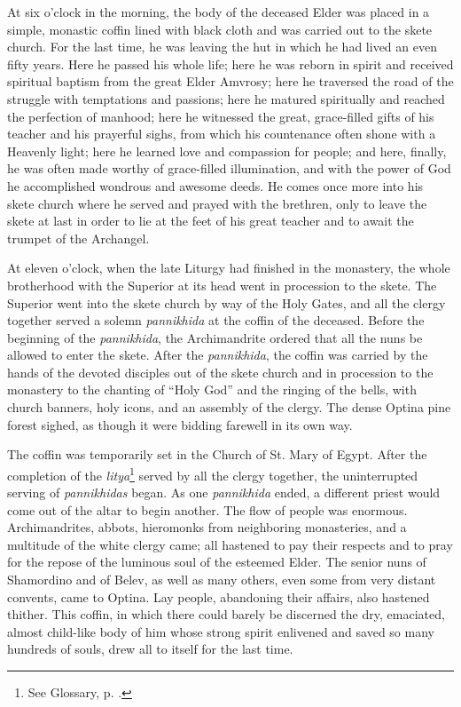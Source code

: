 At six o'clock in the morning, the body of the deceased Elder was placed in a simple, monastic coffin lined with black cloth and was carried out to the skete church. For the last time, he was leaving the hut in which he had lived an even fifty years. Here he passed his whole life; here he was reborn in spirit and received spiritual baptism from the great Elder Amvrosy; here he traversed the road of the struggle with temptations and passions; here he matured spiritually and reached the perfection of manhood; here he witnessed the great, grace-filled gifts of his teacher and his prayerful sighs, from which his countenance often shone with a Heavenly light; here he learned love and compassion for people; and here, finally, he was often made worthy of grace-filled illumination, and with the power of God he accomplished wondrous and awesome deeds. He comes once more into his skete church where he served and prayed with the brethren, only to leave the skete at last in order to lie at the feet of his great teacher and to await the trumpet of the Archangel.

At eleven o'clock, when the late Liturgy had finished in the monastery, the whole brotherhood with the Superior at its head went in procession to the skete. The Superior went into the skete church by way of the Holy Gates, and all the clergy together served a solemn \textit{pannikhida} at the coffin of the deceased. Before the beginning of the \textit{pannikhida}, the Archimandrite ordered that all the nuns be allowed to enter the skete. After the \textit{pannikhida}, the coffin was carried by the hands of the devoted disciples out of the skete church and in procession to the monastery to the chanting of “Holy God” and the ringing of the bells, with church banners, holy icons, and an assembly of the clergy. The dense Optina pine forest sighed, as though it were bidding farewell in its own way.

The coffin was temporarily set in the Church of St. Mary of Egypt. After the completion of the \textit{litya}\footnote{See Glossary, p. \pageref{litya}.} served by all the clergy together, the uninterrupted serving of \textit{pannikhidas} began. As one \textit{pannikhida} ended, a different priest would come out of the altar to begin another. The flow of people was enormous. Archimandrites, abbots, hieromonks from neighboring monasteries, and a multitude of the white clergy came; all hastened to pay their respects and to pray for the repose of the luminous soul of the esteemed Elder. The senior nuns of Shamordino and of Belev, as well as many others, even some from very distant convents, came to Optina. Lay people, abandoning their affairs, also hastened thither. This coffin, in which there could barely be discerned the dry, emaciated, almost child-like body of him whose strong spirit enlivened and saved so many hundreds of souls, drew all to itself for the last time.

